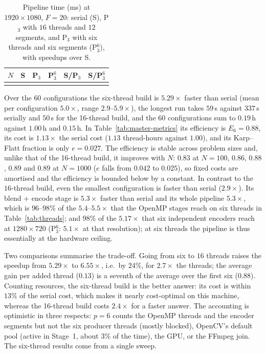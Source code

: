 \documentclass[conference]{IEEEtran}
\begin{document}
\begin{table}[t]
\caption{Pipeline time (ms) at $1920\times1080$, $F{=}20$: serial (S), P$_3$ with $16$ threads and $12$ segments, and P$_3$ with six threads and six segments (P$_3^6$), with speedups over S.}
\label{tab:final}
\centering
\footnotesize
\setlength{\tabcolsep}{3.2pt}
\begin{tabular}{@{}rrrrrr@{}}
\toprule
$N$ & S & P$_3$ & P$_3^6$ & S/P$_3$ & S/P$_3^6$ \\
\midrule
\\
\bottomrule
\end{tabular}
\end{table}

Over the $60$ configurations the six-thread build is $5.29\times$ faster than serial (mean per configuration $5.0\times$, range $2.9$--$5.9\times$), the longest run takes $59$\,s against $337$\,s serially and $50$\,s for the 16-thread build, and the $60$ configurations sum to $0.19$\,h against $1.00$\,h and $0.15$\,h. In Table~\ref{tab:master-metrics} its efficiency is $E_6=0.88$, its cost is $1.13\times$ the serial cost ($1.13$ thread-hours against $1.00$), and its Karp--Flatt fraction is only $e=0.027$. The efficiency is stable across problem sizes and, unlike that of the 16-thread build, it improves with $N$: $0.83$ at $N{=}100$, $0.86$, $0.88$, $0.89$ and $0.89$ at $N{=}1000$ ($e$ falls from $0.042$ to $0.025$), so fixed costs are amortised and the efficiency is bounded below by a constant. In contrast to the $16$-thread build, even the smallest configuration is faster than serial ($2.9\times$). Its blend + encode stage is $5.3\times$ faster than serial and its whole pipeline $5.3\times$, which is $96$--$98\%$ of the $5.4$--$5.5\times$ that the OpenMP stages reach on six threads in Table~\ref{tab:threads}; and $98\%$ of the $5.17\times$ that six independent encoders reach at $1280\times720$ (P$_3^6$: $5.1\times$ at that resolution); at six threads the pipeline is thus essentially at the hardware ceiling.

Two comparisons summarise the trade-off. Going from six to $16$ threads raises the speedup from $5.29\times$ to $6.55\times$, i.e.\ by $24\%$, for $2.7\times$ the threads; the average gain per added thread ($0.13$) is a seventh of the average over the first six ($0.88$). Counting resources, the six-thread build is the better answer: its cost is within $13\%$ of the serial cost, which makes it nearly cost-optimal on this machine, whereas the 16-thread build costs $2.4\times$ for a faster answer. The accounting is optimistic in three respects: $p=6$ counts the OpenMP threads and the encoder segments but not the six producer threads (mostly blocked), OpenCV's default pool (active in Stage~1, about $3\%$ of the time), the GPU, or the FFmpeg join. The six-thread results come from a single sweep.
\end{document}
